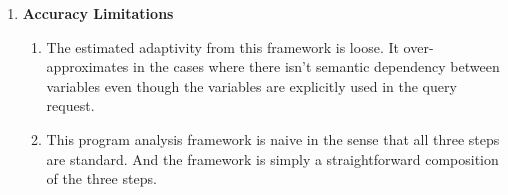 {\begin{enumerate}
\begin{enumerate}
 to be a natural number. 
 This rule limits the program cannot even
 have a loop with an arithmetic expression like $10 + 4$ in the guard.
 Concretely, a simple example program with a loop iterating $5$ times as follows isn't allowed in their work.
 \[
 {\assign{x}{5}};
 \assign{z}{q(x)};
 \eloop (x ) \edo 
 \{
 \assign{z}{q(x + z)};
 \}\}
 \] 
 \item For the same reason as above, their \textbf{Graph Generation} algorithm is limited as well.
 \end{enumerate}
 \item \textbf{Accuracy Limitations}
 \begin{enumerate}
 \item The estimated adaptivity from this framework is loose.
 It over-approximates in the cases where there isn't semantic dependency between variables even though the variables
 are explicitly used in the query request.
 \item This program analysis framework is naive in the sense that all three steps are standard.
 And the framework is simply a straightforward composition of the three steps.
 \end{enumerate}
\end{enumerate}
}